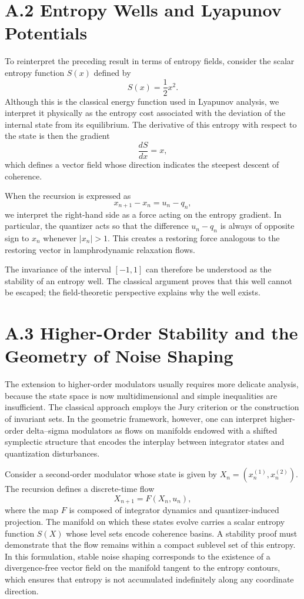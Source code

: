 \section{A.2 Entropy Wells and Lyapunov Potentials}

To reinterpret the preceding result in terms of entropy fields, consider the scalar entropy function \(S(x)\) defined by
\[
S(x) = \frac{1}{2} x^2.
\]
Although this is the classical energy function used in Lyapunov analysis, we interpret it physically as the entropy cost associated with the deviation of the internal state from its equilibrium. The derivative of this entropy with respect to the state is then the gradient
\[
\frac{dS}{dx} = x,
\]
which defines a vector field whose direction indicates the steepest descent of coherence.

When the recursion is expressed as
\[
x_{n+1} - x_n = u_n - q_n,
\]
we interpret the right-hand side as a force acting on the entropy gradient. In particular, the quantizer acts so that the difference \(u_n - q_n\) is always of opposite sign to \(x_n\) whenever \(|x_n|>1\). This creates a restoring force analogous to the restoring vector in lamphrodynamic relaxation flows.

The invariance of the interval \([-1,1]\) can therefore be understood as the stability of an entropy well. The classical argument proves that this well cannot be escaped; the field-theoretic perspective explains why the well exists.

\section{A.3 Higher-Order Stability and the Geometry of Noise Shaping}

The extension to higher-order modulators usually requires more delicate analysis, because the state space is now multidimensional and simple inequalities are insufficient. The classical approach employs the Jury criterion or the construction of invariant sets. In the geometric framework, however, one can interpret higher-order delta–sigma modulators as flows on manifolds endowed with a shifted symplectic structure that encodes the interplay between integrator states and quantization disturbances.

Consider a second-order modulator whose state is given by \(X_n = (x_n^{(1)}, x_n^{(2)})\). The recursion defines a discrete-time flow
\[
X_{n+1} = F(X_n,u_n),
\]
where the map \(F\) is composed of integrator dynamics and quantizer-induced projection. The manifold on which these states evolve carries a scalar entropy function \(S(X)\) whose level sets encode coherence basins. A stability proof must demonstrate that the flow remains within a compact sublevel set of this entropy. In this formulation, stable noise shaping corresponds to the existence of a divergence-free vector field on the manifold tangent to the entropy contours, which ensures that entropy is not accumulated indefinitely along any coordinate direction.

